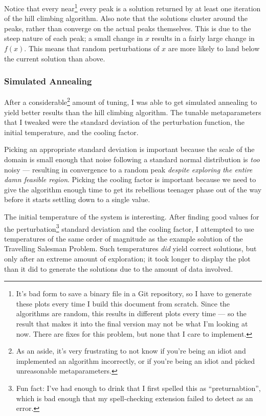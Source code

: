 \documentclass{article}
\begin{document}
Notice that every near\footnote{It's bad form to save a binary file in a Git repository, so I have
    to generate these plots every time I build this document from scratch. Since the algorithms are
    random, this results in different plots every time --- so the result that makes it into the
    final version may not be what I'm looking at now. There are fixes for this problem, but none
    that I care to implement.} every peak is a solution returned by at least one iteration of the
hill climbing algorithm. Also note that the solutions cluster around the peaks, rather than
converge on the actual peaks themselves. This is due to the steep nature of each peak; a small
change in $x$ results in a fairly large change in $f(x)$. This means that random perturbations of
$x$ are more likely to land below the current solution than above.

\subsubsection{Simulated Annealing}

After a considerable\footnote{As an aside, it's very frustrating to not know if you're being an
    idiot and implemented an algorithm incorrectly, or if you're being an idiot and picked
    unreasonable metaparameters.} amount of tuning, I was able to get simulated annealing to yield
better results than the hill climbing algorithm. The tunable metaparameters that I tweaked were the
standard deviation of the perturbation function, the initial temperature, and the cooling factor.

Picking an appropriate standard deviation is important because the scale of the domain is small
enough that noise following a standard normal distribution is \textit{too} noisy --- resulting in
convergence to a random peak \textit{despite exploring the entire damn feasible region}. Picking
the cooling factor is important because we need to give the algorithm enough time to get its
rebellious teenager phase out of the way before it starts settling down to a single value.

The initial temperature of the system is interesting. After finding good values for the
perturbation\footnote{Fun fact: I've had enough to drink that I first spelled this as
    ``preturnabtion'', which is bad enough that my spell-checking extension failed to detect as an
    error.} standard deviation and the cooling factor, I attempted to use temperatures of the same
order of magnitude as the example solution of the Travelling Salesman Problem. Such temperatures
\textit{did} yield correct solutions, but only after an extreme amount of exploration; it took
longer to display the plot than it did to generate the solutions due to the amount of data
involved.
\end{document}
